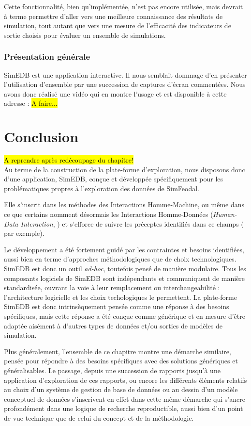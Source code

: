 Cette fonctionnalité, bien qu'implémentée, n'est pas encore utilisée, mais devrait à terme permettre d'aller vers une meilleure connaissance des résultats de simulation, tout autant que vers une mesure de l'efficacité des indicateurs de sortie choisis pour évaluer un ensemble de simulations.

\subsubsection{Présentation générale}

SimEDB est une application interactive.
Il nous semblait dommage d'en présenter l'utilisation d'ensemble par une succession de captures d'écran commentées.
Nous avons donc réalisé une vidéo qui en montre l'usage et est disponible à cette adresse : \hl{A faire...}

\clearpage
\section*{Conclusion}

\hl{A reprendre après redécoupage du chapitre!}\\
Au terme de la construction de la plate-forme d'exploration, nous disposons donc d'une application, SimEDB, conçue et développée spécifiquement pour les problématiques propres à l'exploration des données de SimFeodal.

Elle s'inscrit dans les méthodes des Interactions Homme-Machine, ou même dans ce que certains nomment désormais les \og Interactions Homme-Données\fg{} (\og \textit{Human-Data Interaction}\fg{}, \cite{elmqvist_embodied_2011,mortier_human-data_2014}) et s'efforce de suivre les préceptes identifiés dans ce champs (\cite[167-170]{amirpour_amraii_human-data_2018} par exemple).

Le développement a été fortement guidé par les contraintes et besoins identifiées, aussi bien en terme d'approches méthodologiques que de choix technologiques.
SimEDB est donc un outil \textit{ad-hoc}, toutefois pensé de manière modulaire.
Tous les composants logiciels de SimEDB sont indépendants et communiquent de manière standardisée, ouvrant la voie à leur remplacement ou \og interchangeabilité\fg{} : l'architecture logicielle et les choix techologiques le permettent.
La plate-forme SimEDB est donc intrinsèquement pensée comme une réponse à des besoins spécifiques, mais cette réponse a été conçue comme générique et en mesure d'être adaptée aisément à d'autres types de données et/ou sorties de modèles de simulation.

Plus généralement, l'ensemble de ce chapitre montre une démarche similaire, pensée pour répondre à des besoins spécifiques avec des solutions génériques et généralisables.
Le passage, depuis une succession de rapports jusqu'à une application d'exploration de ces rapports, ou encore les différents éléments relatifs au choix d'un système de gestion de base de données ou au dessin d'un modèle conceptuel de données s'inscrivent en effet dans cette même démarche qui s'ancre profondément dans une logique de recherche reproductible, aussi bien d'un point de vue technique que de celui du concept et de la méthodologie.